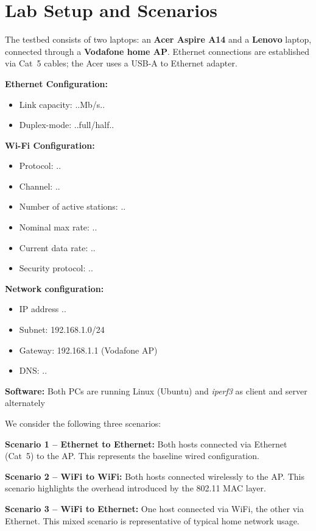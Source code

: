 \section{Lab Setup and Scenarios}

The testbed consists of two laptops: an \textbf{Acer Aspire A14} and a \textbf{Lenovo} laptop, connected through a \textbf{Vodafone home AP}. Ethernet connections are established via Cat~5 cables; the Acer uses a USB-A to Ethernet adapter.

\textbf{Ethernet Configuration:}
\begin{itemize}
    \item Link capacity: ..Mb/s..
    \item Duplex-mode: ..full/half..
\end{itemize}

\textbf{Wi-Fi Configuration:}
\begin{itemize}
    \item Protocol: ..
    \item Channel: ..
    \item Number of active stations: ..
    \item Nominal max rate: ..
    \item Current data rate: ..
    \item Security protocol: ..
\end{itemize}

\textbf{Network configuration:}
\begin{itemize}
    \item IP address ..
    \item Subnet: 192.168.1.0/24
    \item Gateway: 192.168.1.1 (Vodafone AP)
    \item DNS: ..
\end{itemize}

\textbf{Software:}
Both PCs are running Linux (Ubuntu) and \textit{iperf3} as client and server alternately

We consider the following three scenarios:

\textbf{Scenario 1 – Ethernet to Ethernet:} Both hosts connected via Ethernet (Cat~5) to the AP. This represents the baseline wired configuration.

\textbf{Scenario 2 – WiFi to WiFi:} Both hosts connected wirelessly to the AP. This scenario highlights the overhead introduced by the 802.11 MAC layer.

\textbf{Scenario 3 – WiFi to Ethernet:} One host connected via WiFi, the other via Ethernet. This mixed scenario is representative of typical home network usage.

